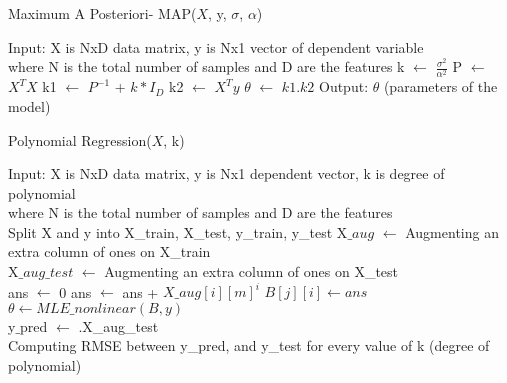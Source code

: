 \documentclass{article}
\begin{document}
\begin{itemize}
    \begin{algorithm}
            \caption{Maximum A Posteriori- MAP($X$, y, $\sigma$, $\alpha$)}
            \begin{algorithmic}
                \STATE Input: X is NxD data matrix, y is Nx1 vector of dependent variable \\ where N is the total number of samples and D are the features
                \STATE k $\longleftarrow$ $\frac{\sigma^{2}}{\alpha^{2}}$
                \STATE P $\longleftarrow$ $X^TX$
                \STATE k1 $\longleftarrow$  $P^{-1}$ + $k*I_D$
                \STATE k2 $\longleftarrow$  $X^Ty$  
                \STATE $\theta$ $\longleftarrow$ $k1.k2$
                \STATE Output: $\theta$ (parameters of the model)
            \end{algorithmic}
        \end{algorithm}
        
    \begin{algorithm}
            \caption{Polynomial Regression($X$, k)}
            \begin{algorithmic}
                \STATE Input: X is NxD data matrix, y is Nx1 dependent vector, k is degree of polynomial \\ where N is the total number of samples and D are the features \\
                \STATE Split X and y into X\_train, X\_test, y\_train, y\_test 
                \STATE X$\_aug$ $\longleftarrow$ Augmenting an extra column of ones on X\_train \\
                \STATE X$\_aug\_test$ $\longleftarrow$ Augmenting an extra column of ones on X\_test \\
                    \STATE ans $\longleftarrow$ 0
                            \STATE ans $\longleftarrow$ ans + $X\_{aug}[i][m]^i$ 
                        \ENDFOR
                        \STATE $B[j][i] \longleftarrow ans$
                    \ENDFOR
                \ENDFOR
                \STATE $\theta \longleftarrow MLE\_nonlinear(B,y)$ \\
                \STATE y$\_$pred $\longleftarrow$ \theta.X\_aug\_test   \\
                \STATE Computing RMSE between y\_pred, and y\_test for every value of k (degree of polynomial)
                
            \end{algorithmic}
        \end{algorithm}    
        

\end{itemize}
\end{document}
